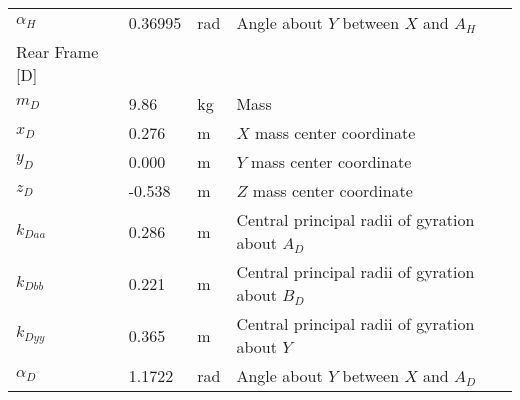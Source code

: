 \documentclass{bmd2019p}
\begin{document}
\begin{table}
\begin{tabular}{llll}
    $\alpha_H$ & 0.36995 & \si{\radian} & Angle about $Y$ between $X$ and $A_H$ \\
    Rear Frame [D] & & \\
    \midrule
    $m_D$ &  9.86 & \si{\kilogram}    & Mass \\
    $x_D$ &  0.276 & \si{\meter}      & $X$ mass center coordinate \\
    $y_D$ & 0.000 & \si{\meter}             & $Y$ mass center coordinate \\
    $z_D$ & -0.538 & \si{\meter}      & $Z$ mass center coordinate \\
    $k_{Daa}$ &  0.286 & \si{\meter}  & Central principal radii of gyration about $A_D$ \\
    $k_{Dbb}$ &  0.221 & \si{\meter}  & Central principal radii of gyration about $B_D$ \\
    $k_{Dyy}$ &  0.365 & \si{\meter}  & Central principal radii of gyration about $Y$ \\
    $\alpha_D$ &  1.1722 & \si{\radian} & Angle about $Y$ between $X$ and $A_D$ \\
    \bottomrule
  \end{tabular}
\end{table}
\end{document}
